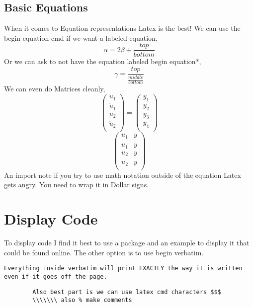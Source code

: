 \documentclass{article}
\begin{document}
    \subsection{Basic Equations}
        When it comes to Equation representations Latex is the best! We can use the begin {equation} cmd if we want a labeled equation,
        \begin{equation}
            \alpha = 2\beta + \frac{top}{bottom} 
        \end{equation}
        Or we can ask to not have the equation labeled begin {equation*},
        \begin{equation*}
            \gamma = \frac{top}{\frac{middle}{bottom}}
        \end{equation*}
        We can even do Matrices cleanly,
        \[ 
        \left( \begin{array}{cc}
            u_{1}  \\ %
            \dot{u}_{1}  \\
            u_{2}  \\
            \dot{u}_{2}  \\
        \end{array} \right) 
        = 
        \left( \begin{array}{cc}
            y_1  \\
            y_2  \\
            y_3  \\
            y_4  \\
        \end{array} \right)
        \]
        \[
        \left( \begin{array}{cc} %
            u_{1} & y\\ %
            \dot{u}_{1} & y\\ %
            u_{2} & y\\
            \dot{u}_{2} & y\\
        \end{array} \right) 
        \]
        An import note if you try to use math notation outside of the equation Latex gets angry. You need to wrap it in Dollar signs.
        

\section{Display Code}
    To display code I find it best to use a package and an example to display it that could be found online. The other option is to use begin verbatim.
    \begin{verbatim}
Everything inside verbatim will print EXACTLY the way it is written even if it goes off the page.
    \end{verbatim}
    \begin{verbatim}
        Also best part is we can use latex cmd characters $$$
        \\\\\\\ also % make comments
    \end{verbatim}
\end{document}
